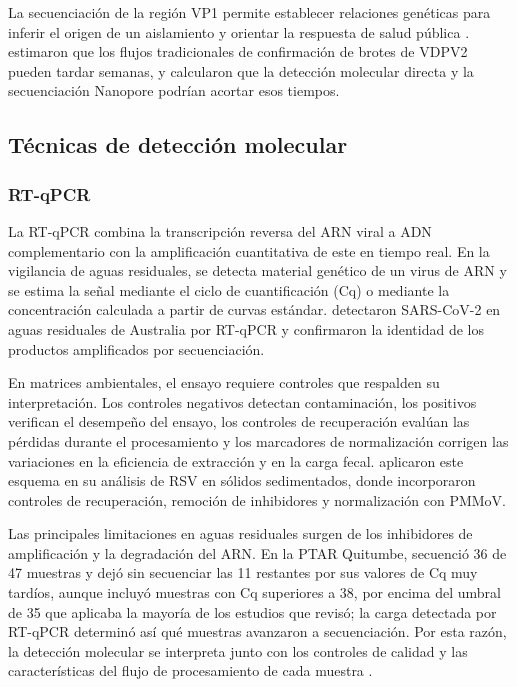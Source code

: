 La secuenciación de la región VP1 permite establecer relaciones genéticas para inferir el origen de un aislamiento y orientar la respuesta de salud pública \cite{Asghar_2014,Klapsa_2022}.  estimaron que los flujos tradicionales de confirmación de brotes de VDPV2 pueden tardar semanas, y calcularon que la detección molecular directa y la secuenciación Nanopore podrían acortar esos tiempos.

\subsection{Técnicas de detección molecular}

\subsubsection{RT-qPCR}

La RT-qPCR combina la transcripción reversa del ARN viral a ADN complementario con la amplificación cuantitativa de este en tiempo real. En la vigilancia de aguas residuales, se detecta material genético de un virus de ARN y se estima la señal mediante el ciclo de cuantificación (Cq) o mediante la concentración calculada a partir de curvas estándar.  detectaron SARS-CoV-2 en aguas residuales de Australia por RT-qPCR y confirmaron la identidad de los productos amplificados por secuenciación.

En matrices ambientales, el ensayo requiere controles que respalden su interpretación. Los controles negativos detectan contaminación, los positivos verifican el desempeño del ensayo, los controles de recuperación evalúan las pérdidas durante el procesamiento y los marcadores de normalización corrigen las variaciones en la eficiencia de extracción y en la carga fecal.  aplicaron este esquema en su análisis de RSV en sólidos sedimentados, donde incorporaron controles de recuperación, remoción de inhibidores y normalización con PMMoV.

Las principales limitaciones en aguas residuales surgen de los inhibidores de amplificación y la degradación del ARN. En la PTAR Quitumbe,  secuenció 36 de 47 muestras y dejó sin secuenciar las 11 restantes por sus valores de Cq muy tardíos, aunque incluyó muestras con Cq superiores a 38, por encima del umbral de 35 que aplicaba la mayoría de los estudios que revisó; la carga detectada por RT-qPCR determinó así qué muestras avanzaron a secuenciación. Por esta razón, la detección molecular se interpreta junto con los controles de calidad y las características del flujo de procesamiento de cada muestra \cite{Parkins_2023}.

